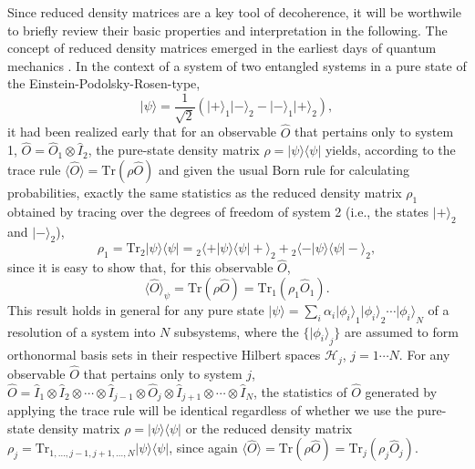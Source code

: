 \documentclass[rmp,aps,amsmath,amsfonts,noshowkeys,noshowpacs,12pt]{revtex4}
\newcommand{\ket}[1]{\ensuremath{|{#1\rangle}}}
\newcommand{\bra}[1]{\ensuremath{{\langle #1}|}}
\begin{document}
Since reduced density matrices are a key tool of decoherence, it will
be worthwile to briefly review their basic properties and
interpretation in the following.  The concept of reduced density
matrices emerged in the earliest days of quantum mechanics
\citetext{\citealp{Landau:1927:uy,Neumann:1932:gq,Furry:1936:pp}; for
  some historical remarks, see \citealp{Pessoa:1998:yl}}. In the
context of a system of two entangled systems in a pure state of the
Einstein-Podolsky-Rosen-type,
%
\begin{equation} \label{eq:epr}
\ket{\psi} = \frac{1}{\sqrt{2}}(\ket{+}_1\ket{-}_2 -
\ket{-}_1\ket{+}_2),
\end{equation}
%
it had been realized early that for an observable $\widehat{O}$ that
pertains only to system 1, $\widehat{O}=\widehat{O}_1 \otimes
\widehat{I}_2$, the pure-state density matrix $\rho =
\ket{\psi}\bra{\psi}$ yields, according to the trace rule $\langle
\widehat{O} \rangle = \text{Tr} (\rho \widehat{O})$ and given the
usual Born rule for calculating probabilities, exactly the same
statistics as the reduced density matrix $\rho_1$ obtained by
tracing over the degrees of freedom of system 2 (i.e., the states
$\ket{+}_2$ and $\ket{-}_2$),
%
\begin{equation} \label{eq:epr-rho}
\rho_1 = \text{Tr}_2 \ket{\psi}\bra{\psi} = {_2\langle +} | \psi 
\rangle \langle \psi | + \rangle_2 + {_2\langle -} | \psi 
\rangle \langle \psi | - \rangle_2,
\end{equation}
%
since it is easy to show that, for this observable $\widehat{O}$,
%
\begin{equation}
\langle \widehat{O} \rangle_{\psi} = \text{Tr} (\rho
\widehat{O}) = \text{Tr}_1 (\rho_1 \widehat{O}_1). 
\end{equation}
%
This result holds in general for any pure state $\ket{\psi} = \sum_i
\alpha_i \ket{\phi_i}_1 \ket{\phi_i}_2 \cdots \ket{\phi_i}_N$ of a
resolution of a system into $N$ subsystems, where the $\{
\ket{\phi_i}_j \}$ are assumed to form orthonormal basis sets in their
respective Hilbert spaces $\mathcal{H}_j$, $j=1 \cdots N$.  For any
observable $\widehat{O}$ that pertains only to system $j$,
$\widehat{O}=\widehat{I}_1 \otimes \widehat{I}_2 \otimes \cdots
\otimes \widehat{I}_{j-1} \otimes \widehat{O}_j \otimes
\widehat{I}_{j+1} \otimes \cdots \otimes \widehat{I}_N$, the
statistics of $\widehat{O}$ generated by applying the trace rule will
be identical regardless of whether we use the pure-state density matrix
$\rho = \ket{\psi} \bra{\psi}$ or the reduced density matrix $\rho_j =
\text{Tr}_{1, \hdots, j-1, j+1, \hdots, N} \ket{\psi} \bra{\psi}$,
since again $\langle \widehat{O} \rangle = \text{Tr} (\rho
\widehat{O}) = \text{Tr}_j (\rho_j \widehat{O}_j)$.
\end{document}
